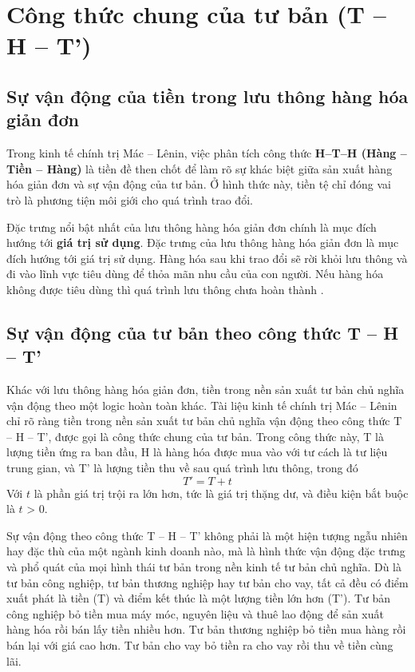 \section{Công thức chung của tư bản (T – H – T')}
\subsection{Sự vận động của tiền trong lưu thông hàng hóa giản đơn}
Trong kinh tế chính trị Mác – Lênin, việc phân tích công thức \textbf{H–T–H (Hàng – Tiền – Hàng)} là tiền đề then chốt để làm rõ sự khác biệt giữa sản xuất hàng hóa giản đơn và sự vận động của tư bản. Ở hình thức này, tiền tệ chỉ đóng vai trò là phương tiện môi giới cho quá trình trao đổi.

Đặc trưng nổi bật nhất của lưu thông hàng hóa giản đơn chính là mục đích hướng tới \textbf{giá trị sử dụng}. Đặc trưng của lưu thông hàng hóa giản đơn là mục đích hướng tới giá trị sử dụng. Hàng hóa sau khi trao đổi sẽ rời khỏi lưu thông và đi vào lĩnh vực tiêu dùng để thỏa mãn nhu cầu của con người. Nếu hàng hóa không được tiêu dùng thì quá trình lưu thông chưa hoàn thành \cite[trang 191 - 192]{marx_engels_23}.

\subsection{Sự vận động của tư bản theo công thức T – H – T'}
Khác với lưu thông hàng hóa giản đơn, tiền trong nền sản xuất tư bản chủ nghĩa vận động theo một logic hoàn toàn khác. Tài liệu kinh tế chính trị Mác – Lênin chỉ rõ ràng tiền trong nền sản xuất tư bản chủ nghĩa vận động theo công thức T – H – T', được gọi là công thức chung của tư bản. Trong công thức này, T là lượng tiền ứng ra ban đầu, H là hàng hóa được mua vào với tư cách là tư liệu trung gian, và T' là lượng tiền thu về sau quá trình lưu thông, trong đó 
\[
    T' = T + t
\]
Với $t$ là phần giá trị trội ra lớn hơn, tức là giá trị thặng dư, và điều kiện bắt buộc là $t$ > 0.

Sự vận động theo công thức T – H – T' không phải là một hiện tượng ngẫu nhiên hay đặc thù của một ngành kinh doanh nào, mà là hình thức vận động đặc trưng và phổ quát của mọi hình thái tư bản trong nền kinh tế tư bản chủ nghĩa. Dù là tư bản công nghiệp, tư bản thương nghiệp hay tư bản cho vay, tất cả đều có điểm xuất phát là tiền (T) và điểm kết thúc là một lượng tiền lớn hơn (T'). Tư bản công nghiệp bỏ tiền mua máy móc, nguyên liệu và thuê lao động để sản xuất hàng hóa rồi bán lấy tiền nhiều hơn. Tư bản thương nghiệp bỏ tiền mua hàng rồi bán lại với giá cao hơn. Tư bản cho vay bỏ tiền ra cho vay rồi thu về tiền cùng lãi.

